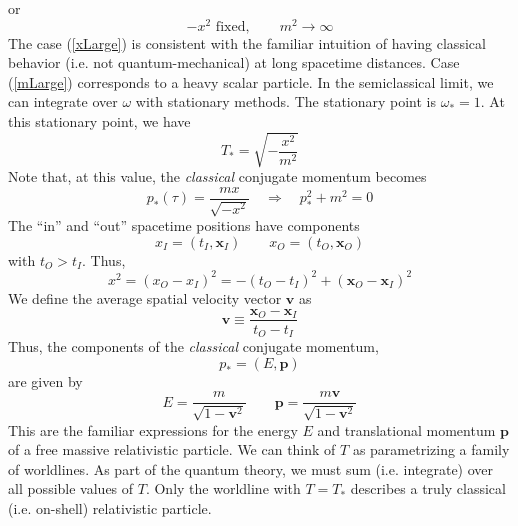 or
\begin{equation}
	{-x^{2}} \text{ fixed}, \qquad m^{2} \rightarrow \infty \label{mLarge}
\end{equation}
The case (\ref{xLarge}) is consistent with the familiar intuition of having classical behavior (i.e. not quantum-mechanical) at long spacetime distances. Case (\ref{mLarge}) corresponds to a heavy scalar particle. In the semiclassical limit, we can integrate over $\omega$ with stationary methods. The stationary point is $\omega_{*} = 1$. At this stationary point, we have
\begin{equation}
	T_{*} = \sqrt{-\frac{x^{2}}{m^{2}}}
\end{equation}
Note that, at this value, the \textit{classical} conjugate momentum becomes
\begin{equation}
	p_{*}(\tau) = \frac{m x}{\sqrt{- x^{2}}} \quad \Longrightarrow \quad p_{*}^{2} + m^{2} = 0 \label{ccmOnShell}
\end{equation}
The ``in'' and ``out'' spacetime positions have components
\begin{equation}
	x_{I} = (t_{I}, \mathbf{x}_{I}) \qquad x_{O} = (t_{O}, \mathbf{x}_{O})
\end{equation}
with $t_{O} > t_{I}$. Thus,
\begin{equation}
	x^{2} = (x_{O} - x_{I})^{2} = -(t_{O} - t_{I})^{2} + (\mathbf{x}_{O} - \mathbf{x}_{I})^{2}
\end{equation}
We define the average spatial velocity vector $\mathbf{v}$ as
\begin{equation}
	\mathbf{v} \equiv \frac{\mathbf{x}_{O} - \mathbf{x}_{I}}{t_{O} - t_{I}}
\end{equation}
Thus, the components of the \textit{classical} conjugate momentum,
\begin{equation}
	p_{*} = (E, \mathbf{p})
\end{equation}
are given by
\begin{equation}
	E = \frac{m}{\sqrt{1 - \mathbf{v}^{2}}} \qquad \mathbf{p} = \frac{m \mathbf{v}}{\sqrt{1 - \mathbf{v}^{2}}}
\end{equation}
This are the familiar expressions for the energy $E$ and translational momentum $\mathbf{p}$ of a free massive relativistic particle. We can think of $T$ as parametrizing a family of worldlines. As part of the quantum theory, we must sum (i.e. integrate) over all possible values of $T$. Only the worldline with $T = T_{*}$ describes a truly classical (i.e. on-shell) relativistic particle.

